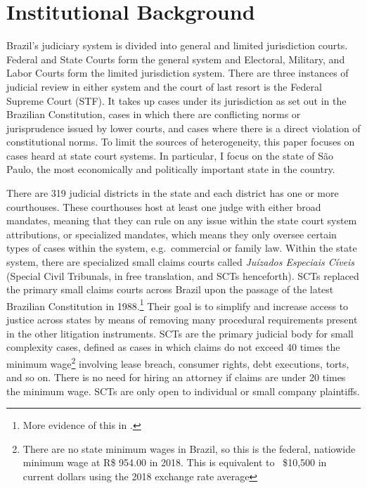 \documentclass[11pt]{article}
\begin{document}
\section{Institutional Background} \label{sec:background_paper2}

Brazil's judiciary system is divided into general and limited jurisdiction courts. Federal and State Courts form the general system and Electoral, Military, and Labor Courts form the limited jurisdiction system. There are three instances of judicial review in either system and the court of last resort is the Federal Supreme Court (STF). It takes up cases under its jurisdiction as set out in the Brazilian Constitution, cases in which there are conflicting norms or jurisprudence issued by lower courts, and cases where there is a direct violation of constitutional norms. To limit the sources of heterogeneity, this paper focuses on cases heard at state court systems. In particular, I focus on the state of São Paulo, the most economically and politically important state in the country.

There are 319 judicial districts in the state and each district has one or more courthouses. These courthouses host at least one judge with either broad mandates, meaning that they can rule on any issue within the state court system attributions, or specialized mandates, which means they only oversee certain types of cases within the system, e.g.~commercial or family law. Within the state system, there are specialized small claims courts called \emph{Juízados Especiais Cíveis} (Special Civil Tribunals, in free translation, and SCTs henceforth). SCTs replaced the primary small claims courts across Brazil upon the passage of the latest Brazilian Constitution in 1988.\footnote{More evidence of this in \citet{LichandAccessJusticeEntrepreneurship2014}.} Their goal is to simplify and increase access to justice across states by means of removing many procedural requirements present in the other litigation instruments. SCTs are the primary judicial body for small complexity cases, defined as cases in which claims do not exceed 40 times the minimum wage\footnote{There are no state minimum wages in Brazil, so this is the federal, natiowide minimum wage at R\$ 954.00 in 2018. This is equivalent to ~\$10,500 in current dollars using the 2018 exchange rate average} involving lease breach, consumer rights, debt executions, torts, and so on. There is no need for hiring an attorney if claims are under 20 times the minimum wage. SCTs are only open to individual or small company plaintiffs.
\end{document}
